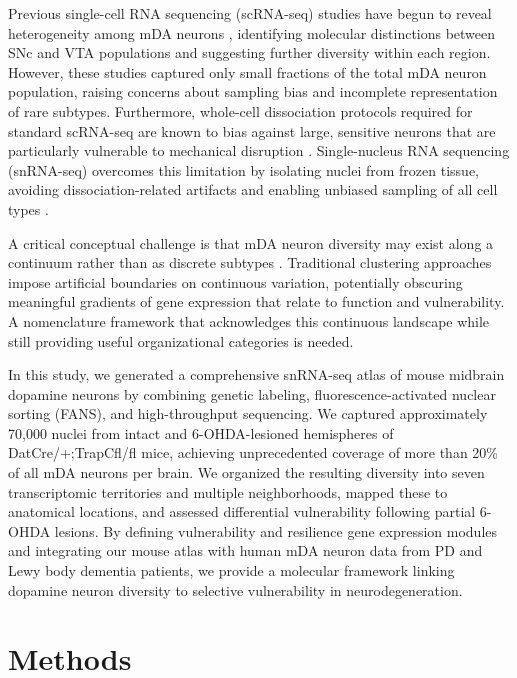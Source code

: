 \documentclass[12pt]{article}
\begin{document}
Previous single-cell RNA sequencing (scRNA-seq) studies have begun to reveal heterogeneity among mDA neurons \citep{poulin2014defining, lamanna2019single, tiklova2019single}, identifying molecular distinctions between SNc and VTA populations and suggesting further diversity within each region. However, these studies captured only small fractions of the total mDA neuron population, raising concerns about sampling bias and incomplete representation of rare subtypes. Furthermore, whole-cell dissociation protocols required for standard scRNA-seq are known to bias against large, sensitive neurons that are particularly vulnerable to mechanical disruption \citep{bakken2018single}. Single-nucleus RNA sequencing (snRNA-seq) overcomes this limitation by isolating nuclei from frozen tissue, avoiding dissociation-related artifacts and enabling unbiased sampling of all cell types \citep{habib2017massively, lake2018integrative}.

A critical conceptual challenge is that mDA neuron diversity may exist along a continuum rather than as discrete subtypes \citep{saunders2018molecular}. Traditional clustering approaches impose artificial boundaries on continuous variation, potentially obscuring meaningful gradients of gene expression that relate to function and vulnerability. A nomenclature framework that acknowledges this continuous landscape while still providing useful organizational categories is needed.

In this study, we generated a comprehensive snRNA-seq atlas of mouse midbrain dopamine neurons by combining genetic labeling, fluorescence-activated nuclear sorting (FANS), and high-throughput sequencing. We captured approximately 70,000 nuclei from intact and 6-OHDA-lesioned hemispheres of DatCre/+;TrapCfl/fl mice, achieving unprecedented coverage of more than 20\% of all mDA neurons per brain. We organized the resulting diversity into seven transcriptomic territories and multiple neighborhoods, mapped these to anatomical locations, and assessed differential vulnerability following partial 6-OHDA lesions. By defining vulnerability and resilience gene expression modules and integrating our mouse atlas with human mDA neuron data from PD and Lewy body dementia patients, we provide a molecular framework linking dopamine neuron diversity to selective vulnerability in neurodegeneration.

\section{Methods}
\end{document}
